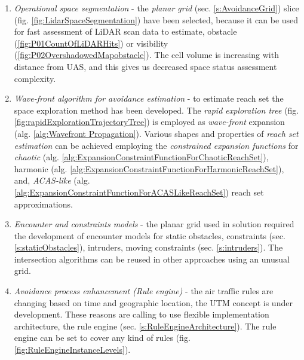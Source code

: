 \begin{enumerate}
    \item \emph{Operational space segmentation} - the \emph{planar grid} (sec. \ref{s:AvoidanceGrid}) slice (fig. \ref{fig:LidarSpaceSegmentation}) have been selected, because it can be used for fast assessment of LiDAR scan data to estimate, obstacle (\ref{fig:P01CountOfLiDARHits}) or visibility (\ref{fig:P02OvershadowedMapobstacle}). The cell volume is increasing with distance from UAS, and this gives us decreased space status assessment complexity.
    
    \item \emph{Wave-front algorithm for avoidance estimation} - to estimate reach set the space exploration method has been developed. The \emph{rapid exploration tree} (fig. \ref{fig:rapidExplorationTrajectoryTree}) is employed as \emph{wave-front} expansion (alg. \ref{alg:Wavefront Propagation}). Various shapes and properties of \emph{reach set estimation} can be achieved employing the \emph{constrained expansion functions} for \emph{chaotic} (alg. \ref{alg:ExpansionConstraintFunctionForChaoticReachSet}), harmonic (alg. \ref{alg:ExpansionConstraintFunctionForHarmonicReachSet}), and, \emph{ACAS-like} (alg. \ref{alg:ExpansionConstraintFunctionForACASLikeReachSet}) reach set approximations.
    
    \item \emph{Encounter and constraints models} - the planar grid used in solution required the development of encounter models for static obstacles, constraints (sec. \ref{s:staticObstacles}), intruders, moving constraints (sec. \ref{s:intruders}). The intersection algorithms can be reused in other approaches using an unusual grid.
    
    \item \emph{Avoidance process enhancement (Rule engine)} - the air traffic rules are changing based on time and geographic location, the UTM concept is under development. These reasons are calling to use flexible implementation architecture, the rule engine (sec. \ref{s:RuleEngineArchitecture}). The rule engine can be set to cover any kind of rules (fig. \ref{fig:RuleEngineInstanceLevels}).
\end{enumerate}